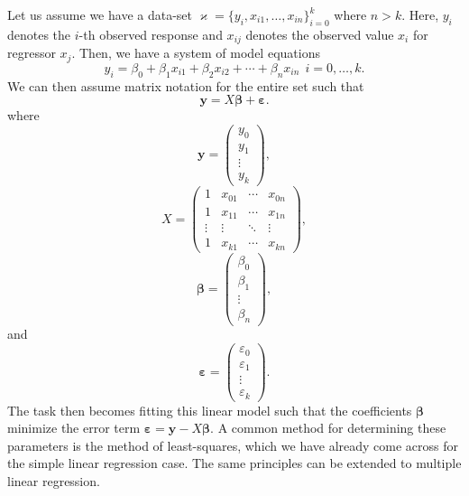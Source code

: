 \documentclass[10pt,a4paper, twocolumn, conference]{IEEEtran}
\theoremstyle{own}
\theoremstyle{definition}
\theoremstyle{plain}
\begin{document}
Let us assume we have a data-set $\varkappa = \{y_i, x_{i1}, \ldots, x_{in} \}_{i=0}^k$ where $n > k$. Here, $y_i$ denotes the $i$-th observed response and $x_{ij}$ denotes the observed value $x_i$ for regressor $x_j$. Then, we have a system of model equations
\begin{equation}
y_i = \beta_0 + \beta_1 x_{i1} + \beta_2 x_{i2} + \cdots + \beta_n x_{in} ~~ i = 0, \ldots, k.
\end{equation}
We can then assume matrix notation for the entire set such that
\begin{equation}
\mathbf{y} = X \boldsymbol\beta + \boldsymbol\varepsilon.
\end{equation}
where
\begin{equation}
\mathbf{y} = \left( \begin{matrix} y_0 \\ y_1 \\ \vdots \\ y_k \end{matrix} \right),
\end{equation}
\begin{equation}
X = \left( \begin{matrix}
1 & x_{01} & \cdots & x_{0n} \\
1 & x_{11} & \cdots & x_{1n} \\
\vdots & \vdots & \ddots & \vdots \\
1 & x_{k1} & \cdots & x_{kn} 
\end{matrix} \right),
\end{equation}
\begin{equation}
\boldsymbol\beta = \left( \begin{matrix} \beta_0 \\ \beta_1 \\ \vdots \\ \beta_n \end{matrix} \right),
\end{equation}
and
\begin{equation}
\boldsymbol\varepsilon = \left( \begin{matrix} \varepsilon_0 \\ \varepsilon_1 \\ \vdots \\ \varepsilon_k \end{matrix} \right).
\end{equation}
The task then becomes fitting this linear model such that the coefficients $\boldsymbol\beta$ minimize the error term $\boldsymbol\varepsilon = \mathbf{y} - X \boldsymbol\beta$. A common method for determining these parameters is the method of least-squares, which we have already come across for the simple linear regression case. The same principles can be extended to multiple linear regression.
\end{document}
